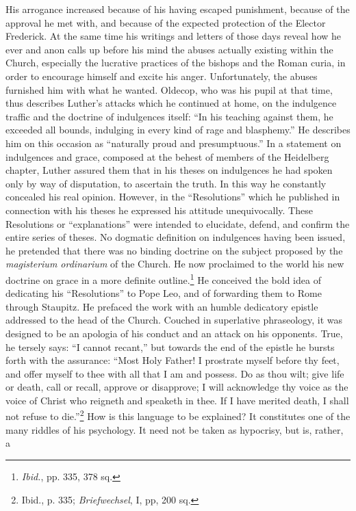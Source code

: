 His arrogance increased because of his having escaped punishment,
because of the approval he met with, and because of the expected
protection of the Elector Frederick. At the same time his writings
and letters of those days reveal how he ever and anon calls up before
his mind the abuses actually existing within the Church, especially
the lucrative practices of the bishops and the Roman curia, in order
to encourage himself and excite his anger. Unfortunately, the abuses
furnished him with what he wanted. Oldecop, who was his pupil at
that time, thus describes Luther’s attacks which he continued at home,
on the indulgence traffic and the doctrine of indulgences itself:
“In his teaching against them, he exceeded all bounds, indulging in
every kind of rage and blasphemy.” He describes him on this occasion
as “naturally proud and presumptuous.” In a statement on indulgences and
grace, composed at the behest of members of the Heidelberg chapter, Luther
assured them that in his theses on indulgences
he had spoken only by way of disputation, to ascertain the truth.
In this way he constantly concealed his real opinion. However, in
the “Resolutions” which he published in connection with his theses
he expressed his attitude unequivocally. These Resolutions or “explanations”
were intended to elucidate, defend, and confirm the entire
series of theses. No dogmatic definition on indulgences having been
issued, he pretended that there was no binding doctrine on the subject
proposed by the \textit{magisterium ordinarium} of the Church. He
now proclaimed to the world his new doctrine on grace in a more
definite outline.\footnote{\textit{Ibid.}, pp. 335, 378 sq.}
He conceived the bold idea of dedicating his
“Resolutions” to Pope Leo, and of forwarding them to Rome through
Staupitz. He prefaced the work with an humble dedicatory epistle
addressed to the head of the Church. Couched in superlative phraseology,
it was designed to be an apologia of his conduct and an attack
on his opponents. True, he tersely says: “I cannot recant,” but
towards the end of the epistle he bursts forth with the assurance:
“Most Holy Father! I prostrate myself before thy feet, and offer
myself to thee with all that I am and possess. Do as thou wilt; give
life or death, call or recall, approve or disapprove; I will acknowledge
thy voice as the voice of Christ who reigneth and speaketh in thee.
If I have merited death, I shall not refuse to die.”\footnote
{Ibid., p. 335; \textit{Briefwechsel}, I, pp, 200 sq.}
How is this language to be explained? It constitutes one of the many riddles of
his psychology. It need not be taken as hypocrisy, but is, rather, a
